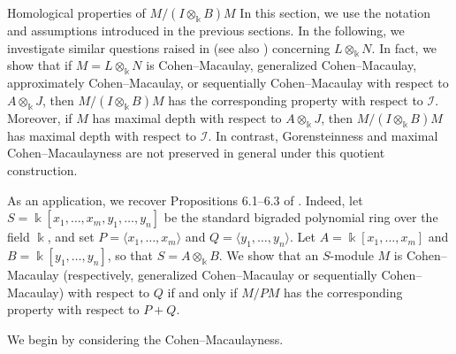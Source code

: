 \documentclass[10pt,a4paper]{amsart}
\makeatletter
\numberwithin{equation}{theorem}
\theoremstyle{definition}
\theoremstyle{fact}
\theoremstyle{conjecture}
\def\section{\@startsection{section}{1}%
\z@{.7\linespacing\@plus\linespacing}{.5\linespacing}%
{\normalfont\Large\bfseries\filcenter}}
\makeatother
\begin{document}
\section{Homological properties of $M/(I\otimes_{\Bbbk}B)M$}
In this section, we use the notation and assumptions introduced in the previous sections.
In the following, we investigate similar questions raised in \cite[Question 6.4]{R5} (see also \cite[Question 1.2]{NR})
concerning $L\otimes_\Bbbk N$. In fact, we show that if $M=L\otimes_\Bbbk N$ is Cohen--Macaulay,
generalized Cohen--Macaulay, approximately Cohen--Macaulay, or sequentially Cohen--Macaulay with
respect to $A\otimes_\Bbbk J$, then $M/(I\otimes_\Bbbk B)M$ has the corresponding property with
respect to $\mathcal{I}$. Moreover, if $M$ has maximal depth with respect to
$A\otimes_\Bbbk J$, then $M/(I\otimes_\Bbbk B)M$ has maximal depth with respect to $\mathcal{I}$. In contrast, Gorensteinness
and maximal Cohen--Macaulayness are not preserved in general under this quotient construction.

As an application, we recover Propositions 6.1--6.3 of \cite{R5}.
Indeed, let
$
S=\Bbbk[x_1,\ldots,x_m,y_1,\ldots,y_n]
$
be the standard bigraded polynomial ring over the field $\Bbbk$,
and set $P=\langle x_1, \ldots, x_m \rangle$ and $Q= \langle y_1, \ldots, y_n \rangle$.
Let $A=\Bbbk[x_1, \ldots, x_m]$ and $B=\Bbbk[y_1,\ldots,y_n]$,
so that $S=A\otimes_\Bbbk B$.
We show that an $S$-module $M$ is Cohen--Macaulay
(respectively, generalized Cohen--Macaulay or sequentially
Cohen--Macaulay) with respect to $Q$ if and only if $M/PM$
has the corresponding property with respect to $P+Q$.


We begin by considering the Cohen--Macaulayness.
\end{document}
